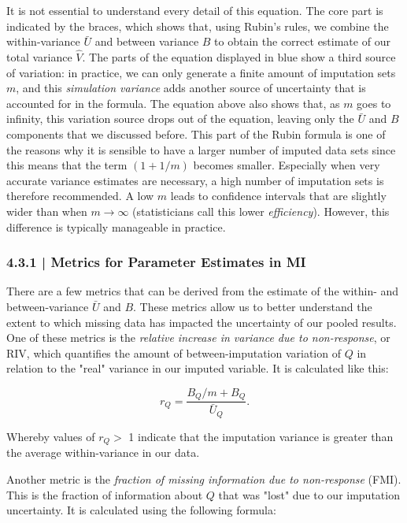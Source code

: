 It is not essential to understand every detail of this equation. The core part is indicated by the braces, which shows that, using Rubin's rules, we combine the within-variance $\bar U$ and between variance $B$ to obtain the correct estimate of our total variance $\hat V$. The parts of the equation displayed in blue show a third source of variation: in practice, we can only generate a finite amount of imputation sets $m$, and this \emph{simulation variance} adds another source of uncertainty that is accounted for in the formula. The equation above also shows that, as $m$ goes to infinity, this variation source drops out of the equation, leaving only the $\bar U$ and $B$ components that we discussed before. This part of the Rubin formula is one of the reasons why it is sensible to have a larger number of imputed data sets since this means that the term $(1+1/m)$ becomes smaller. Especially when very accurate variance estimates are necessary, a high number of imputation sets is therefore recommended. A low $m$ leads to confidence intervals that are slightly wider than when $m \rightarrow \infty$ (statisticians call this lower \emph{efficiency}). However, this difference is typically manageable in practice.


\subsubsection{{\normalfont\textsf{\textcolor{sBlue}{\small 4.3.1 |}}} Metrics for Parameter Estimates in MI}

There are a few metrics that can be derived from the estimate of the within- and between-variance $\bar U$ and $B$. These metrics allow us to better understand the extent to which missing data has impacted the uncertainty of our pooled results. One of these metrics is the \emph{relative increase in variance due to non-response}, or RIV, which quantifies the amount of between-imputation variation of $Q$ in relation to the "real" variance in our imputed variable. It is calculated like this:

\begin{equation}
r_Q = \frac{B_Q/m +B_Q}{\bar{U}_Q}.
\end{equation}

Whereby values of $r_Q >$ 1 indicate that the imputation variance is greater than the average within-variance in our data.

Another metric is the \emph{fraction of missing information due to non-response} (FMI). This is the fraction of information about $Q$ that was "lost" due to our imputation uncertainty. It is calculated using the following formula:

